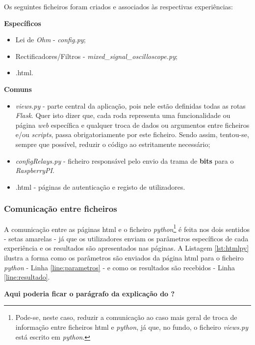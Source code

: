 Os seguintes ficheiros foram criados e associados às respectivas experiências:

\textbf{Específicos}
\begin{itemize}
	\item Lei de \textit{Ohm} - \textit{config.py};
	\item Rectificadores/Filtros - \textit{mixed\_signal\_oscilloscope.py};
	\item {}.html.
\end{itemize}

\textbf{Comuns}
\begin{itemize}
	\item \textit{views.py} - parte central da aplicação, pois nele estão definidas todas as rotas \textit{Flask}. Quer isto dizer que, cada roda representa uma funcionalidade ou página \textit{web} específica e qualquer troca de dados ou argumentos entre ficheiros e/ou \textit{scripts}, passa obrigatoriamente por este ficheiro. Sendo assim, tentou-se, sempre que possível, reduzir o código ao estritamente necessário;
	\item \textit{configRelays.py} - ficheiro responsável pelo envio da trama de \textbf{bits} para o \textit{RaspberryPI}.
	\item {}.html - páginas de autenticação e registo de utilizadores.
\end{itemize}

\subsubsection{Comunicação entre ficheiros}
\label{sec:comunicacaoentrefich}
A comunicação entre as páginas \acrshort{html} e o ficheiro \textit{python}\footnote{Pode-se, neste caso, reduzir a comunicação ao caso mais geral de troca de informação entre ficheiros \acrshort{html} e \textit{python}, já que, no fundo, o ficheiro \textit{views.py} está escrito em \textit{python}.} é feita nos dois sentidos - setas amarelas - já que os utilizadores enviam os parâmetros específicos de cada experiência e os resultados são apresentados nas páginas. A Listagem \ref{lst:htmlpy} ilustra a forma como os parâmetros são enviados da página \acrshort{html} para o ficheiro \textit{python} - Linha \ref{line:parametros} - e como os resultados são recebidos - Linha \ref{line:resultado}.

\textbf{Aqui poderia ficar o parágrafo da explicação do ?}

